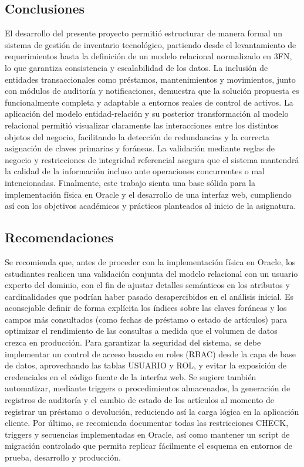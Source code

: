 \documentclass{article}
\begin{document}
\subsection{Conclusiones}
El desarrollo del presente proyecto permitió estructurar de manera formal un sistema de gestión de inventario tecnológico, partiendo desde el levantamiento de requerimientos hasta la definición de un modelo relacional normalizado en 3FN, lo que garantiza consistencia y escalabilidad de los datos. La inclusión de entidades transaccionales como préstamos, mantenimientos y movimientos, junto con módulos de auditoría y notificaciones, demuestra que la solución propuesta es funcionalmente completa y adaptable a entornos reales de control de activos. La aplicación del modelo entidad-relación y su posterior transformación al modelo relacional permitió visualizar claramente las interacciones entre los distintos objetos del negocio, facilitando la detección de redundancias y la correcta asignación de claves primarias y foráneas. La validación mediante reglas de negocio y restricciones de integridad referencial asegura que el sistema mantendrá la calidad de la información incluso ante operaciones concurrentes o mal intencionadas. Finalmente, este trabajo sienta una base sólida para la implementación física en Oracle y el desarrollo de una interfaz web, cumpliendo así con los objetivos académicos y prácticos planteados al inicio de la asignatura.


\subsection{Recomendaciones}
Se recomienda que, antes de proceder con la implementación física en Oracle, los estudiantes realicen una validación conjunta del modelo relacional con un usuario experto del dominio, con el fin de ajustar detalles semánticos en los atributos y cardinalidades que podrían haber pasado desapercibidos en el análisis inicial. Es aconsejable definir de forma explícita los índices sobre las claves foráneas y los campos más consultados (como fechas de préstamo o estado de artículos) para optimizar el rendimiento de las consultas a medida que el volumen de datos crezca en producción. Para garantizar la seguridad del sistema, se debe implementar un control de acceso basado en roles (RBAC) desde la capa de base de datos, aprovechando las tablas USUARIO y ROL, y evitar la exposición de credenciales en el código fuente de la interfaz web. Se sugiere también automatizar, mediante triggers o procedimientos almacenados, la generación de registros de auditoría y el cambio de estado de los artículos al momento de registrar un préstamo o devolución, reduciendo así la carga lógica en la aplicación cliente. Por último, se recomienda documentar todas las restricciones CHECK, triggers y secuencias implementadas en Oracle, así como mantener un script de migración controlado que permita replicar fácilmente el esquema en entornos de prueba, desarrollo y producción.


\vspace{-3em} %
\renewcommand{\refname}{}




\vfill
\end{document}
